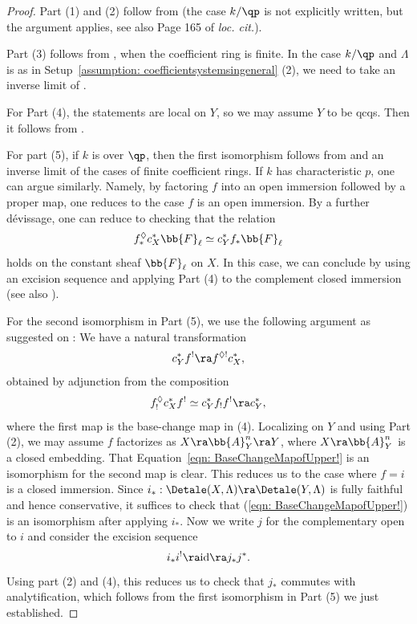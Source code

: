 \documentclass[letterpaper,11pt]{amsart}
\begin{document}
\begin{proof}
Part (1) and (2) follow from \cite[Proposition 27.1, 27.2]{Ecod} (the case $k/\qp$ is not explicitly written, but the argument applies, see also Page 165 of \textit{loc. cit.}). 

Part (3) follows from \cite[Proposition 27.2, Proposition 27.7]{Ecod}, when the coefficient ring is finite. In the case $k/\qp$ and $\Lambda$ is as in Setup~\ref{assumption: coefficientsystemsingeneral} (2), we need to take an inverse limit of \cite[Proposition 27.7]{Ecod}.

For Part (4), the statements are local on $Y$, so we may assume $Y$ to be qcqs. Then it follows from \cite[Proposition 27.4, 27.5]{Ecod}. 

For part (5), if $k$ is over $\qp$, then the first isomorphism follows from \cite[Proposition 27.6]{Ecod} and an inverse limit of the cases of finite coefficient rings. If $k$ has characteristic $p$, one can argue similarly. Namely, by factoring $f$ into an open immersion followed by a proper map, one reduces to the case $f$ is an open immersion. By a further d\'evissage, one can reduce to checking that the relation 
\[f^{\Diamond}_\ast c_{X}^\ast \bb{F}_\ell\simeq c_{Y}^\ast f_\ast\bb{F}_\ell\]
holds on the constant sheaf $\bb{F}_\ell$ on $X$. In this case, we can conclude by using an excision sequence and applying Part (4) to the complement closed immersion (see also \cite[Lemma~3.3.2]{GHILZIsocComparison}).

For the second isomorphism in Part (5), we use the following argument as suggested on \cite[Page~128,Footnote~2]{FSGeomLLC}: We have a natural transformation 
\begin{equation}{\label{eqn: BaseChangeMapofUpper!}}
 c_{Y}^{*}f^{!} \ra f^{\Diamond!}c_{X}^{*},
\end{equation}
obtained by adjunction from the composition 
\[ f_{!}^{\Diamond}c_{X}^{*}f^{!} \simeq c_{Y}^{*}f_{!}f^{!} \ra c^{*}_{Y},\]
where the first map is the base-change map in (4). Localizing on $Y$ and using Part (2), we may assume $f$ factorizes as $X \ra \bb{A}^{n}_{Y} \ra Y$, where $X \ra \bb{A}^{n}_{Y}$ is a closed embedding. That Equation~\eqref{eqn: BaseChangeMapofUpper!} is an isomorphism for the second map is clear. This reduces us to the case where $f=i$ is a closed immersion. Since $i_\ast: \Detale(X,\Lambda) \ra \Detale(Y,\Lambda)$ is fully faithful and hence conservative, it suffices to check that (\ref{eqn: BaseChangeMapofUpper!}) is an isomorphism  after applying $i_{*}$. Now we write $j$ for the complementary open to $i$ and consider the excision sequence
\[ i_{*}i^{!} \ra \mathrm{id} \ra j_{*}j^{*}. \]
Using part (2) and (4), this reduces us to check that $j_{*}$ commutes with analytification, which follows from the first isomorphism in Part (5) we just established. 


\end{proof}
\end{document}
